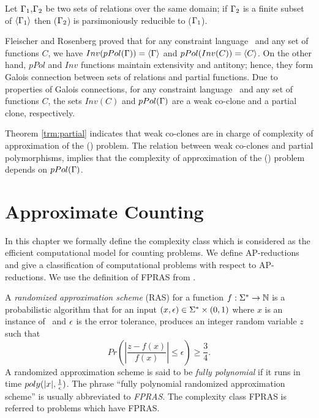 \begin{theorem}  \label{trm:partial}
Let \(\Gamma_1\),\(\Gamma_2\) be two sets of relations over the same domain; if 
\(\Gamma_2\) is a finite subset of \(\langle \Gamma_1 \rangle\) then
\ccsp(\(\Gamma_2\)) is parsimoniously reducible to \ccsp(\(\Gamma_1\))\@.
\end{theorem}

Fleischer and Rosenberg \cite{Rosenberg} proved that for any constraint language \mrelset\
and any set of functions \(C\),
we have \(Inv(pPol(\Gamma))=\langle \Gamma \rangle\) and
\(pPol(Inv(C))=\langle C \rangle\)\@. On the other hand, \(pPol\) and \(Inv\) functions 
maintain extensivity and antitony; hence, they form Galois connection between 
sets of relations and partial functions. Due to properties of Galois connections,
for any constraint language \mrelset\ and any set of functions \(C\), the 
sets \(Inv(C)\) and \(pPol(\Gamma)\) are a weak co-clone and a partial clone, respectively.

Theorem \ref{trm:partial} indicates that weak co-clones are
in charge of complexity of approximation of the \ccsp(\mrelset) problem.
The relation between weak co-clones and partial polymorphisms,
implies that the complexity of approximation of the \ccsp(\mrelset) problem 
depends on \(pPol(\Gamma)\)\@.

\chapter{Approximate Counting} \label{chp:approx}
In this chapter we formally define the complexity class which
is considered as the efficient computational model for counting problems.
We define AP-reductions and give a classification of computational problems 
with respect to AP-reductions. We use the definition of FPRAS from \cite{counting}\@. 

A \emph{randomized approximation scheme} (RAS) for a function \(f:\Sigma^*\to\mathbb{N}\)
is a probabilistic algorithm that for an input \((x,\epsilon)\in\Sigma^*\times(0,1)\) 
where \(x\) is an instance of \mf\ and \(\epsilon\) is the error tolerance, 
produces an integer random variable \(z\) such that 
\[Pr\left(\left|\frac{z-f(x)}{f(x)}\right|\le \epsilon\right) \ge \frac{3}{4}.\]
A randomized approximation scheme is said to be \emph{fully polynomial} if it runs in time \(poly(|x|,\frac{1}{\epsilon})\)\@. 
The phrase ``fully polynomial randomized approximation scheme'' is usually abbreviated to 
\emph{FPRAS}\@. The complexity class FPRAS is referred to problems which have FPRAS\@.

